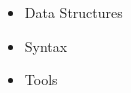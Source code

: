 \begin{itemize}
\begin{itemize}
\begin{itemize}
\begin{itemize}
            \end{itemize}

        \end{itemize}

      \item Data Structures

      \item Syntax

      \item Tools

    \end{itemize}

\end{itemize}



